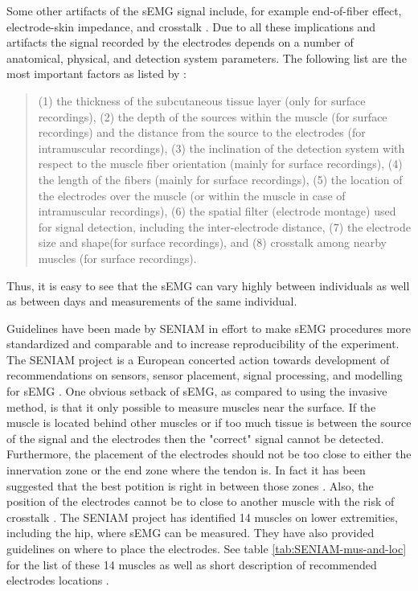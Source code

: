 Some other artifacts of the \ac{sEMG} signal include, for example end-of-fiber effect, electrode-skin impedance, and crosstalk \cite{Farina2016}.
Due to all these implications and artifacts the signal recorded by the electrodes depends on a number of anatomical, physical, and detection system parameters. The following list are the most important factors as listed by :
\begin{quote}
(1) the thickness of the subcutaneous tissue layer (only for surface recordings),
(2) the depth of the sources within the muscle (for surface recordings) and the distance from the source to the electrodes (for intramuscular recordings),
(3) the inclination of the detection system with respect to the muscle fiber orientation (mainly for surface recordings),
(4) the length of the fibers (mainly for surface recordings),
(5) the location of the electrodes over the muscle (or within the muscle in case of intramuscular recordings),
(6) the spatial filter (electrode montage) used for signal detection, including the inter-electrode distance,
(7) the electrode size and shape(for surface recordings), and
(8) crosstalk among nearby muscles (for surface recordings).
\end{quote}
Thus, it is easy to see that the \ac{sEMG} can vary highly between individuals as well as between days and measurements of the same individual.

Guidelines have been made by \ac{SENIAM} in effort to make \ac{sEMG} procedures more standardized and comparable and to increase reproducibility of the experiment. 
The \ac{SENIAM} project is a European concerted action towards development of recommendations on sensors, sensor placement, signal processing, and modelling for \ac{sEMG} \cite{Hermens1999, Hermens2000}.
One obvious setback of \ac{sEMG}, as compared to using the invasive method, is that it only possible to measure muscles near the surface.
If the muscle is located behind other muscles or if too much tissue is between the source of the signal and the electrodes then the "correct" signal cannot be detected. 
Furthermore, the placement of the electrodes should not be too close to either the innervation zone or the end zone where the tendon is.
In fact it has been suggested that the best potition is right in between those zones \cite{Farina2016, Hermens2000}.
Also, the position of the electrodes cannot be to close to another muscle with the risk of crosstalk \cite{Farina2016, Hermens2000}.
The \ac{SENIAM} project has identified 14 muscles on lower extremities, including the hip, where \ac{sEMG} can be measured.
They have also provided guidelines on where to place the electrodes.
See table \ref{tab:SENIAM-mus-and-loc} for the list of these 14 muscles as well as short description of recommended electrodes locations \cite{Hermens1999}.

